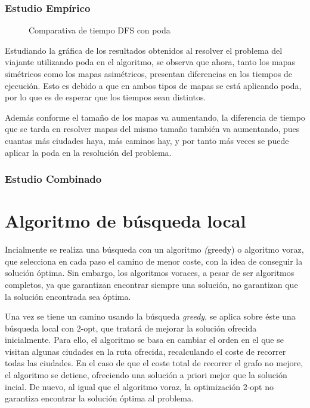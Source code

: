 \documentclass{uc3mpracticas}
\begin{document}
  \subsubsection{Estudio Empírico}
  
  \begin{figure}[!h]
    \caption{Comparativa de tiempo DFS con poda}
    \label{fig:compDFSpoda}
  \end{figure}

  Estudiando la gráfica de los resultados obtenidos al resolver el problema del viajante utilizando poda en el algoritmo, se observa que ahora, tanto los mapas simétricos como los mapas asimétricos, presentan diferencias en los tiempos de ejecución. Esto es debido a que en ambos tipos de mapas se está aplicando poda, por lo que es de esperar que los tiempos sean distintos.

  \vspace{2mm}

  Además conforme el tamaño de los mapas va aumentando, la diferencia de tiempo que se tarda en resolver mapas del mismo tamaño también va aumentando, pues cuantas más ciudades haya, más caminos hay, y por tanto más veces se puede aplicar la poda en la resolución del problema.

  \subsubsection{Estudio Combinado}





  \clearpage

  \section{Algoritmo de búsqueda local}

  Incialmente se realiza una búsqueda con un algoritmo \textit(greedy) o algoritmo voraz, que selecciona en cada paso el camino de menor coste, con la idea de conseguir la solución óptima. Sin embargo, los algoritmos voraces, a pesar de ser algoritmos completos, ya que garantizan encontrar siempre una solución, no garantizan que la solución encontrada sea óptima. 

  \vspace{2mm}

  Una vez se tiene un camino usando la búsqueda \textit{greedy}, se aplica sobre éste una búsqueda local con 2-opt, que tratará de mejorar la solución ofrecida inicialmente. Para ello, el algoritmo se basa en cambiar el orden en el que se visitan algunas ciudades en la ruta ofrecida, recalculando el coste de recorrer todas las ciudades. En el caso de que el coste total de recorrer el grafo no mejore, el algoritmo se detiene, ofreciendo una solución a priori mejor que la solución incial. De nuevo, al igual que el algoritmo voraz, la optimización 2-opt no garantiza encontrar la solución óptima al problema. 
  
\end{document}
